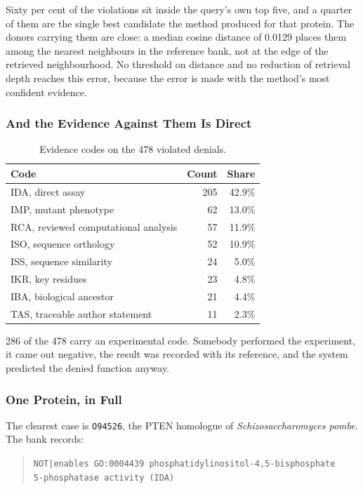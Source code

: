 Sixty per cent of the violations sit inside the query's own top five, and a quarter of
them are the single best candidate the method produced for that protein. The donors
carrying them are close: a median cosine distance of 0.0129 places them among the
nearest neighbours in the reference bank, not at the edge of the retrieved
neighbourhood. No threshold on distance and no reduction of retrieval depth reaches
this error, because the error is made with the method's most confident evidence.

\subsubsection{And the Evidence Against Them Is Direct}

\begin{table}[htbp]
\centering
\caption{Evidence codes on the 478 violated denials.}
\label{tab:exp16-evidence}
\begin{tabular}{lrr}
\toprule
Code & Count & Share \\
\midrule
IDA, direct assay & 205 & 42.9\% \\
IMP, mutant phenotype & 62 & 13.0\% \\
RCA, reviewed computational analysis & 57 & 11.9\% \\
ISO, sequence orthology & 52 & 10.9\% \\
ISS, sequence similarity & 24 & 5.0\% \\
IKR, key residues & 23 & 4.8\% \\
IBA, biological ancestor & 21 & 4.4\% \\
TAS, traceable author statement & 11 & 2.3\% \\
\bottomrule
\end{tabular}
\end{table}

286 of the 478 carry an experimental code. Somebody performed the experiment, it came
out negative, the result was recorded with its reference, and the system predicted the
denied function anyway.

\subsubsection{One Protein, in Full}

The clearest case is \texttt{O94526}, the PTEN homologue of \emph{Schizosaccharomyces
pombe}. The bank records:

\begin{quote}
\texttt{NOT|enables GO:0004439 phosphatidylinositol-4,5-bisphosphate\\ 5-phosphatase activity (IDA)}
\end{quote}

